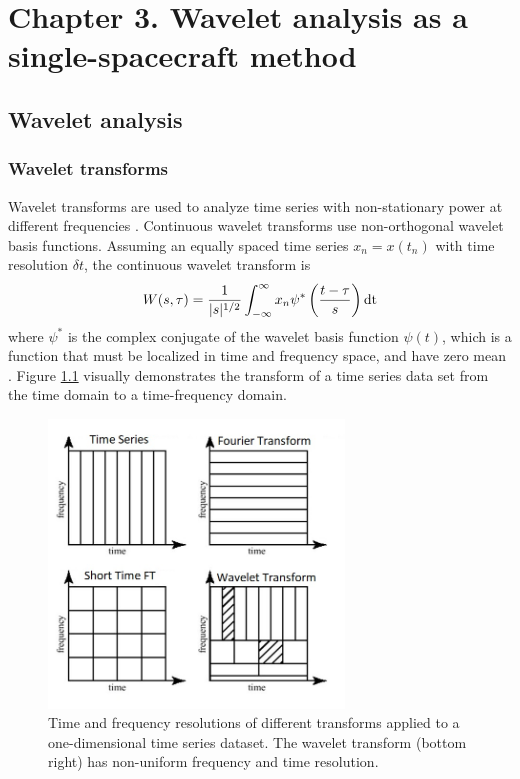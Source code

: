 \chapter{Chapter 3. Wavelet analysis as a single-spacecraft method}

\section{Wavelet analysis}
%

\subsection{Wavelet transforms}
Wavelet transforms are used to analyze time series with non-stationary power at different frequencies \cite{Torrence:1998}. Continuous wavelet transforms use non-orthogonal wavelet basis functions. Assuming  an equally spaced time series $x_n=x(t_n)$ with time resolution $\delta t$, the continuous wavelet transform is
\begin{equation}
    W(s,\tau) = \frac{1}{|s|^{1/2}}\int_{-\infty}^\infty x_n\psi^*\left( \frac{t-\tau}{s} \right)\textnormal{dt}
    \label{wavetrans}
\end{equation}
where $\psi^*$ is the complex conjugate of the wavelet basis function $\psi(t)$, which is a function that must be localized in time and frequency space, and have zero mean \citep{Torrence:1998}. Figure \ref{fig:wavelet-diagram} visually demonstrates the transform of a time series data set from the time domain to a time-frequency domain.

\begin{figure}
    \centering
    \includegraphics[width=0.7\textwidth]{Figures/Comparisonoftransformations.jpeg}
    \caption[Time and frequency resolutions of different transforms]{Time and frequency resolutions of different transforms applied to a one-dimensional time series dataset. The wavelet transform (bottom right) has non-uniform frequency and time resolution.}
    \label{fig:wavelet-diagram}
\end{figure}

